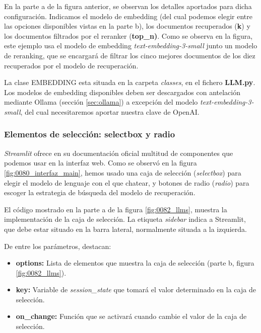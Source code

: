                 \noindent En la parte a de la figura anterior, se observan los detalles aportados para dicha configuración. Indicamos el modelo de embedding (del cual podemos elegir entre las opciones disponibles vistas en la parte b), los documentos recuperados (\textbf{k}) y los documentos filtrados por el reranker (\textbf{top\_n)}. Como se observa en la figura, este ejemplo usa el modelo de embedding \textit{text-embedding-3-small} junto un modelo de reranking, que se encargará de filtrar los cinco mejores documentos de los diez recuperados por el modelo de recuperación.

                \noindent La clase EMBEDDING esta situada en la carpeta \textit{classes}, en el fichero \textbf{LLM.py}. Los modelos de embedding disponibles deben ser descargados con antelación mediante Ollama (sección \ref{sec:ollama}) a excepción del modelo \textit{text-embedding-3-small}, del cual necesitaremos aportar nuestra clave de OpenAI.

            \subsubsection{Elementos de selección: selectbox y radio}  

                \textit{Streamlit} ofrece en su documentación oficial multitud de componentes que podemos usar en la interfaz web. Como se observó en la figura \ref{fig:0080_interfaz_main}, hemos usado una caja de selección (\textit{selectbox}) para elegir el modelo de lenguaje con el que chatear, y botones de radio (\textit{radio}) para escoger la estrategia de búsqueda del modelo de recuperación.

                \noindent El código mostrado en la parte a de la figura \ref{fig:0082_llms}, muestra la implementación de la caja de selección. La etiqueta \textit{sidebar} indica a Streamlit, que debe estar situado en la barra lateral, normalmente situada a la izquierda.

                \noindent De entre los parámetros, destacan: 

                \begin{itemize}
                    \item \textbf{options:} Lista de elementos que muestra la caja de selección (parte b, figura \ref{fig:0082_llms}).
                    \item \textbf{key:} Variable de \textit{session\_state} que tomará el valor determinado en la caja de selección.
                    \item \textbf{on\_change:} Función que se activará cuando cambie el valor de la caja de selección.
                \end{itemize}
    
